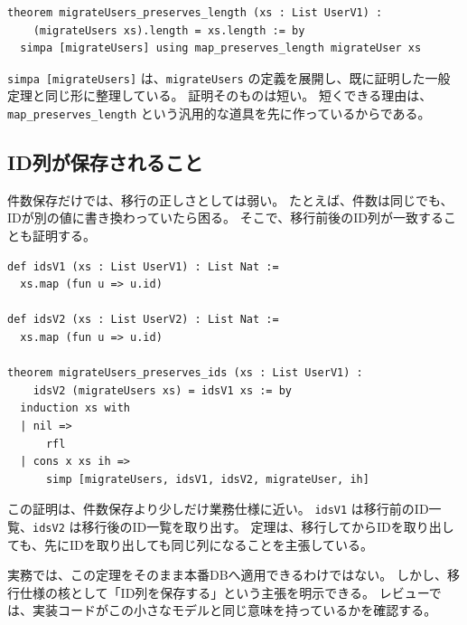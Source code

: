 \begin{listing}[htbp]
\begin{verbatim}
theorem migrateUsers_preserves_length (xs : List UserV1) :
    (migrateUsers xs).length = xs.length := by
  simpa [migrateUsers] using map_preserves_length migrateUser xs
\end{verbatim}
\caption{ユーザー一覧の移行は件数を保存する}
\label{lst:induction-migrate-length}
\end{listing}

\texttt{simpa [migrateUsers]} は、\texttt{migrateUsers} の定義を展開し、既に証明した一般定理と同じ形に整理している。
証明そのものは短い。
短くできる理由は、\texttt{map\_preserves\_length} という汎用的な道具を先に作っているからである。

\subsection{ID列が保存されること}

件数保存だけでは、移行の正しさとしては弱い。
たとえば、件数は同じでも、IDが別の値に書き換わっていたら困る。
そこで、移行前後のID列が一致することも証明する。

\begin{listing}[htbp]
\begin{verbatim}
def idsV1 (xs : List UserV1) : List Nat :=
  xs.map (fun u => u.id)

def idsV2 (xs : List UserV2) : List Nat :=
  xs.map (fun u => u.id)

theorem migrateUsers_preserves_ids (xs : List UserV1) :
    idsV2 (migrateUsers xs) = idsV1 xs := by
  induction xs with
  | nil =>
      rfl
  | cons x xs ih =>
      simp [migrateUsers, idsV1, idsV2, migrateUser, ih]
\end{verbatim}
\caption{移行前後のID列が一致する}
\label{lst:induction-list-ids}
\end{listing}

この証明は、件数保存より少しだけ業務仕様に近い。
\texttt{idsV1} は移行前のID一覧、\texttt{idsV2} は移行後のID一覧を取り出す。
定理は、移行してからIDを取り出しても、先にIDを取り出しても同じ列になることを主張している。

\begin{softwarebox}
実務では、この定理をそのまま本番DBへ適用できるわけではない。
しかし、移行仕様の核として「ID列を保存する」という主張を明示できる。
レビューでは、実装コードがこの小さなモデルと同じ意味を持っているかを確認する。
\end{softwarebox}

